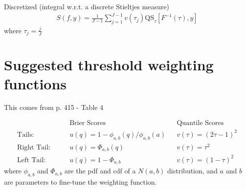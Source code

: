 \documentclass[11pt]{article}
\begin{document}
Discretized (integral w.r.t. a discrete Stieltjes measure)
\begin{align}
    S(f, y) = \frac{ 1 }{ J - 1} \sum_{ j = 1 }^{ J-1 } v(\tau_j) \text{QS}_\tau [ F^{-1}(\tau), y ]
\end{align}
where $\tau_j = \frac{ j }{ J }$

\section{Suggested threshold weighting functions} \label{sec:weighting}
This comes from p. 415 - Table 4

\begin{align}
    & \text{Brier Scores} && \text{Quantile Scores}\\
    \text{Tails:} \qquad & u(q) = 1 - \phi_{a, b}(q) / \phi_{a,b}(a) && v(\tau) = (2 \tau - 1)^2\\
    \text{Right Tail:} \qquad & u(q) = \Phi_{a, b}(q) && v(\tau) = \tau^2\\
    \text{Left Tail:} \qquad & u(q) = 1 - \Phi_{a, b} && v(\tau) = (1 - \tau)^2
\end{align}
where $\phi_{a, b}$ and $\Phi_{a, b}$ are the pdf and cdf of a $N(a, b)$ distribution, and $a$ and $b$ are parameters to fine-tune the weighting function.




\end{document}
